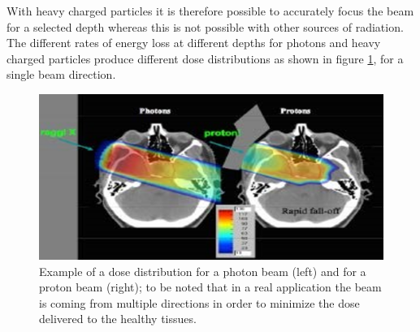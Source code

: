 \noindent With heavy charged particles it is therefore possible to accurately focus the beam for a selected depth whereas this is not possible with other sources of radiation.
\newline
The different rates of energy loss at different depths for photons and heavy charged particles produce different dose distributions as shown in figure \ref{fig:Dose}, for a single beam direction.
\begin{figure}[H]
	\centering
	\includegraphics[width=0.7\linewidth]{IMG/ch1/Dose}
	\caption{Example of a dose distribution for a photon beam (left) and for a proton beam (right); to be noted that in a real application the beam is coming from multiple directions in order to minimize the dose delivered to the healthy tissues.}
	\label{fig:Dose}
\end{figure}

